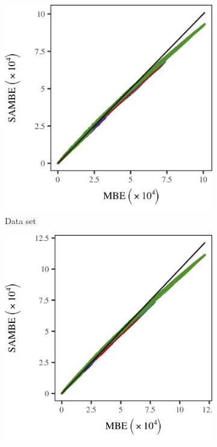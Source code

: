 		\begin{figure}
			\centering
			\begin{subfigure}{0.3\textwidth}
				\centering
				\includegraphics[keepaspectratio=true, width=\textwidth, height=0.23\textheight]{discussion/img/ferdosi_3_120000_mbe_sambe.png}
				\caption{Data set \ferdosiThree}
				\label{fig:discussion:performance:mbevssambe:ferdosi3}
			\end{subfigure}
			\begin{subfigure}{0.3\textwidth}
				\centering
				\includegraphics[keepaspectratio=true, width=\textwidth, height=0.23\textheight]{discussion/img/baakman_3_120000_mbe_sambe.png}

\end{subfigure}
\end{figure}
